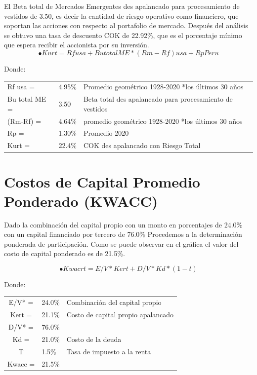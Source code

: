 \documentclass[a4paper,openright,12pt]{book}
\begin{document}
El Beta total de Mercados Emergentes des apalancado para procesamiento de vestidos de 3.50, es decir la cantidad de riesgo operativo como financiero, que soportan las acciones con respecto al portafolio de mercado.
Después del análisis se obtuvo una tasa de descuento COK de 22.92\%, que es el porcentaje mínimo que espera recibir el accionista por su inversión.
\begin{equation}
•Kurt=Rf usa+Bu totalME*(Rm-Rf)usa+Rp Peru
\end{equation}

Donde:							

\begin{table}[H]
\begin{tabular}{lll}
Rf usa =        & 4.95\% & Promedio geométrico 1928-2020 *los últimos 30 años         \\
Bu total ME   = & 3.50   & Beta total des apalancado para   procesamiento de vestidos \\
(Rm-Rf) =       & 4.64\% & promedio geométrico   1928-2020 *los últimos 30 años       \\
Rp =            & 1.30\% & Promedio 2020                                              \\
Kurt =          & 22.4\% & COK des apalancado con   Riesgo Total                     
\end{tabular}
\end{table}


\section{Costos de Capital Promedio Ponderado (KWACC)}

Dado la combinación del capital propio con un monto en porcentajes de 24.0\% con un capital financiado por tercero de 76.0\% Procedemos a la determinación ponderada de participación. Como se puede observar en el gráfica el valor del costo de capital ponderado es de 21.5\%.

\begin{equation}
•Kwac rt=E/V*Kert+D/V*Kd*(1-t)
\end{equation}

Donde:

\begin{table}[H]
\begin{tabular}{cll}
E/V* =  & 24.0\% & Combinación del capital propio       \\
Kert =  & 21.1\% & Costo de capital propio   apalancado \\
D/V* =  & 76.0\% &                                      \\
Kd =    & 21.0\% & Costo de la deuda                    \\
T       & 1.5\%  & Tasa de impuesto a la   renta        \\
Kwacc = & 21.5\% &                                     
\end{tabular}
\end{table}
\end{document}
